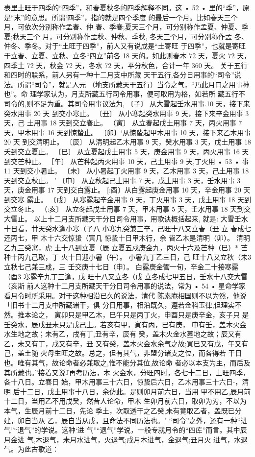 表里土旺于四季的“四季”，和春夏秋冬的四季解释不同。这
• 52 •
里的“季”，原是“末”的意思。所谓‘四季”，指的就是四个季度
的最后一个月。比如春天三个月，可依次分别称作孟春、仲
春、季春;夏天三个月，可分别称作孟夏、仲夏、季夏;秋天三个
月，可分别称作孟秋、仲秋、季秋, 冬天三个月，可分别称作孟
冬、仲冬、季冬。对于“土旺于四季”，前人又有说成是“土寄旺
于四季”，也就是寄旺于立春、立夏、立秋、立冬“四立”前各 18
天的。如此则春木 72 天，夏火 72 天，四季土 72 天，秋金 72
天，冬水 72 天，平分秋色，合计一年 360 天。
关于五行和四时的联系，前人另有一种十二月支中所藏
天干五行,各分日用事的“司令”说法。所谓“司令”，就是人元
（地支所藏天干五行）当令之气，“乃此月曰之用事神也”。命
理学家认为，月支所藏五行司令用事，便可取用为格，如若所
藏五行不司令的,则不足为重。其司令用事议法为,
〔子〕 从大雪起壬水用事.10 天，接下来癸水用事 20 天
到交小寒止。
〔丑〕 从小寒起癸水用事 9 天，接下来辛金用事 3 天，己
土用事 18 天到交立春止。
（寅〕 从立春起戊土用事 7 天，丙火用事 7 天，甲木用事
16 天到惊蛰止。
〔卯〕‘从惊蛰起甲木用事 10 天，接下来乙木用事 20 天
到交清明止。
〔辰〕 从清明起乙木用事 9 天，癸水用事 3 天，戊土用事
18 夭到交立夏止。
〔巳〕 从立夏起戊土用事 5 天，庚金用事 9 天，丙火用事
16 天到交芒种止。
［午〕 从芒种起丙火用事 10 天，己土用事 9 天,丁火用
• 53 •
事 11 天到交小暑止。
〔未〕 从小暑起丁火用事 9 天，乙木用事 3 天，己土用事
18 天到交立秋止。 '
〔申〕 从立秋起己土用事 7 天，戊土用事 3 天，壬水用事
3 天，庚金用事 17 天到交白露止。
[:酉〕从白露起庚金用事 10 天，辛金用事 20 天到交寒
露止。
〔戌〕 从寒露起辛金用事 9 天，丁火用事 3 天，戊土用事
18 天到交立冬止。
（:亥〕 从立冬起戊土用事 7 天，甲木用事 5 天，壬水用事
18 天到交大雪止。
以上十二月支所藏天干分日司令用事，用歌诀概括起来,
就是:
大雪壬水十日看，廿天癸水逢小寒（子八
小寒九癸兼三辛，己旺十八又立春（丑
立 春成七还丙七，甲 木十六交惊蛰（寅几
惊蛰十日甲木行，余 皆乙木是清明（卯）。
清明乙九三癸寓，虎 土十八到立夏（辰
立夏五戍庚金九，丙火十六及芒种（巳）*
芒种十丙九己取，丁 火十日迎小暑（午）。
小暑九丁乙三日，己 旺十八又立秋（未3
立秋七己兼三成，三 壬交庚十七日（申）。
白露庚金管一旬，辛金二十接寒露（酉3
寒露辛九丁三逢，戊 旺十八又立冬（戌
立冬成七甲五日，壬水十八交大雪（亥斯
前人这种十二月支所藏天干分日司令用事的说法，常为
• 54 •
星命学家看月令时所采用。对于这种相沿已久的说法，清代
陈素庵相国则不以为然，他说「旧书十二月支中所藏诸干，俱
分日用事，相沿既久，遵若金科玉律,但理实不然。推本论之，
寅卯只是甲乙木，巳午只是丙丁火，申酉只是庚辛金，亥子只
是壬癸水，辰戌丑未只是戊己土。若亥有甲，寅有丙，巳有庚，
申有壬，盖木火金水生地之故；未有乙，戌有丁,丑有辛，辰有
癸，盖木火金水墓地之故；辰又有乙，未又有丁，戌又有辛，丑
又有癸，盖木火金水余气之故;寅巳又有戊，午又有己，盖土随
火母生旺之故。总之，但有其气，非盟分诸支之位，而各得若
干日也。唯有其气，故论命者必兼取之,惟不能分其位,故论命
者必以本支为主，而后及其所藏也。”接着又说J再考历法，木
火金水，分旺四时，各七十二日，土旺四季，各十八日。立春日
始，甲木用事三十六日，惊蛰后六日，乙木用事三十六日-，清明
后十二日，戊土用事十八日，余仿此。是则卯月前六日，当用
甲不用乙,辰月前十二日，当用乙不用戊癸，然昔人论命，甲木
生卯月前六日，取卯为刃，不以为本气，生辰月前十二日，先论
季土，次取透干之乙癸,未有竟取乙者，盖既已分建，卯自当从
乙，辰自当从戊，且命法不同历法也。"
“司令”之外，还有一种“进气”“退气”的学说。这种‘进
气”“退气”学说，一般专就月令的“四库”而言。其中辰月金进
气,木退气，未月水进气，火退气;戌月木进气，金退气;丑月火
进气，水退气。为此古歌道：


